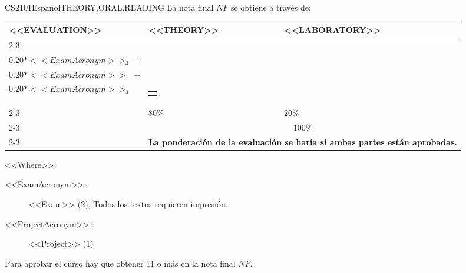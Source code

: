   \begin{evaluation}{CS2101}{Espanol}{THEORY,ORAL,READING}
  La nota final $NF$ se obtiene a través de:
 
  \begin{tabularx}{0.9\textwidth}{|X|p{}|p{}|} \hline
  \multirow{4}{*}{\uppercase{<<Evaluation>>}} & \uppercase{<<Theory>>} & \uppercase{<<Laboratory>>} \\ \cline{2-3}
  & %
      \begin{minipage}{0.95\textwidth}
      \begin{tabular}{l}
          $0.20* <<ExamAcronym>>_{2}$ + \\ 
          $0.20* <<ExamAcronym>>_{3}$ + \\  
          $0.20* <<ExamAcronym>>_{1}$ + \\  
          $0.20* <<ExamAcronym>>_{4}$
      \end{tabular} 
      \end{minipage} 
  & %
      \begin{minipage}{0.95\textwidth}
      \begin{tabular}{l}
          $0.20*<<ProjectAcronym>>_{1}$
          \end{tabular} 
      \end{minipage}                 \\ \cline{2-3}
  
  & %
  80\% 
  & %
  20\% \\ \cline{2-3}
  & \multicolumn{2}{c|}{100\%}  \\ \cline{2-3}
  & \multicolumn{2}{c|}{\textbf{La ponderación de la evaluación se haría si ambas partes están aprobadas.}}  \\ \hline
  \end{tabularx}
  
  \vspace{2mm}
  \noindent <<Where>>:
  \begin{description}
      \item[<<ExamAcronym>>:] <<Exam>> (2), Todos los textos requieren impresión.
      \item[<<ProjectAcronym>> :] <<Project>> (1)
  \end{description}
      
  \noindent Para aprobar el curso hay que obtener 11 o más en la nota final $NF$.
  \end{evaluation}
 
